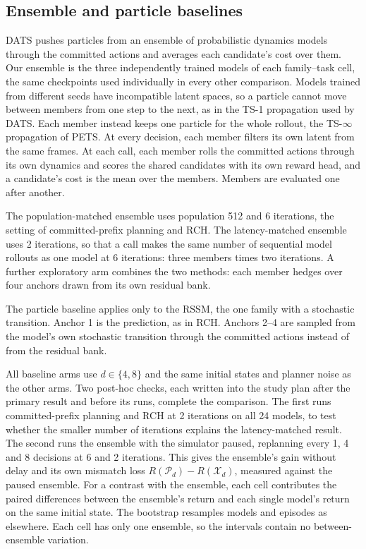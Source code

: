 \documentclass[aps,physrev,\manuscriptlayout,superscriptaddress,
  longbibliography,amsmath,amssymb]{revtex4-2}
\begin{document}
\subsection{Ensemble and particle baselines}\label{sec:ensemble-methods}

DATS\cite{chen2020dats} pushes particles from an ensemble of probabilistic dynamics models through the committed actions and averages each candidate's cost over them. Our ensemble is the three independently trained models of each family--task cell, the same checkpoints used individually in every other comparison. Models trained from different seeds have incompatible latent spaces, so a particle cannot move between members from one step to the next, as in the TS-1 propagation used by DATS. Each member instead keeps one particle for the whole rollout, the TS-$\infty$ propagation of PETS\cite{chua2018pets}. At every decision, each member filters its own latent from the same frames. At each call, each member rolls the committed actions through its own dynamics and scores the shared candidates with its own reward head, and a candidate's cost is the mean over the members. Members are evaluated one after another.

The population-matched ensemble uses population 512 and 6 iterations, the setting of committed-prefix planning and RCH. The latency-matched ensemble uses 2 iterations, so that a call makes the same number of sequential model rollouts as one model at 6 iterations: three members times two iterations. A further exploratory arm combines the two methods: each member hedges over four anchors drawn from its own residual bank.

The particle baseline applies only to the RSSM, the one family with a stochastic transition. Anchor 1 is the prediction, as in RCH. Anchors 2--4 are sampled from the model's own stochastic transition through the committed actions instead of from the residual bank.

All baseline arms use $d\in\{4,8\}$ and the same initial states and planner noise as the other arms. Two post-hoc checks, each written into the study plan after the primary result and before its runs, complete the comparison. The first runs committed-prefix planning and RCH at 2 iterations on all 24 models, to test whether the smaller number of iterations explains the latency-matched result. The second runs the ensemble with the simulator paused, replanning every 1, 4 and 8 decisions at 6 and 2 iterations. This gives the ensemble's gain without delay and its own mismatch loss $R(\mathcal{P}_d)-R(\mathcal{X}_d)$, measured against the paused ensemble. For a contrast with the ensemble, each cell contributes the paired differences between the ensemble's return and each single model's return on the same initial state. The bootstrap resamples models and episodes as elsewhere. Each cell has only one ensemble, so the intervals contain no between-ensemble variation.
\end{document}
